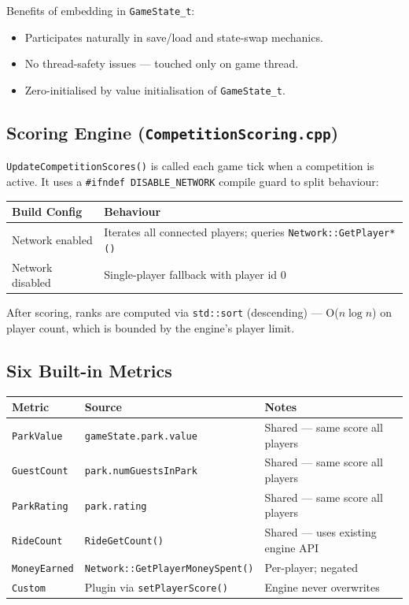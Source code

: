 \documentclass[12pt,a4paper]{article}
\begin{document}
Benefits of embedding in \texttt{GameState\_t}:
\begin{itemize}[noitemsep]
  \item Participates naturally in save/load and state-swap mechanics.
  \item No thread-safety issues --- touched only on game thread.
  \item Zero-initialised by value initialisation of \texttt{GameState\_t}.
\end{itemize}

\subsection{Scoring Engine (\texttt{CompetitionScoring.cpp})}

\texttt{UpdateCompetitionScores()} is called each game tick when a competition is active.
It uses a \texttt{\#ifndef DISABLE\_NETWORK} compile guard to split behaviour:

\begin{table}[h!]
\centering
\begin{tabularx}{\linewidth}{lX}
\toprule
\textbf{Build Config} & \textbf{Behaviour} \\
\midrule
Network enabled & Iterates all connected players; queries \texttt{Network::GetPlayer*()} \\
Network disabled & Single-player fallback with player id 0 \\
\bottomrule
\end{tabularx}
\end{table}

After scoring, ranks are computed via \texttt{std::sort} (descending) --- O($n \log n$) on player count,
which is bounded by the engine's player limit.

\subsection{Six Built-in Metrics}

\begin{table}[h!]
\centering
\begin{tabularx}{\linewidth}{llX}
\toprule
\textbf{Metric} & \textbf{Source} & \textbf{Notes} \\
\midrule
\texttt{ParkValue} & \texttt{gameState.park.value} & Shared --- same score all players \\
\texttt{GuestCount} & \texttt{park.numGuestsInPark} & Shared --- same score all players \\
\texttt{ParkRating} & \texttt{park.rating} & Shared --- same score all players \\
\texttt{RideCount} & \texttt{RideGetCount()} & Shared --- uses existing engine API \\
\texttt{MoneyEarned} & \texttt{Network::GetPlayerMoneySpent()} & Per-player; negated \\
\texttt{Custom} & Plugin via \texttt{setPlayerScore()} & Engine never overwrites \\
\bottomrule
\end{tabularx}
\end{table}
\end{document}

